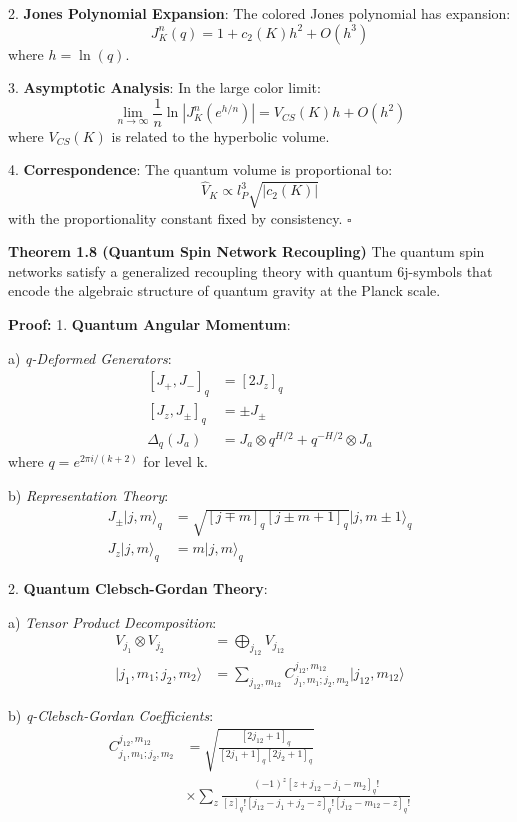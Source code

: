 \documentclass[12pt,a4paper]{article}
\begin{document}
2. \textbf{Jones Polynomial Expansion}:
   The colored Jones polynomial has expansion:
   \[
   J_K^n(q) = 1 + c_2(K)h^2 + O(h^3)
   \]
   where $h = \ln(q)$.

3. \textbf{Asymptotic Analysis}:
   In the large color limit:
   \[
   \lim_{n\to\infty} \frac{1}{n}\ln|J_K^n(e^{h/n})| = V_{CS}(K)h + O(h^2)
   \]
   where $V_{CS}(K)$ is related to the hyperbolic volume.

4. \textbf{Correspondence}:
   The quantum volume is proportional to:
   \[
   \hat{V}_K \propto l_P^3\sqrt{|c_2(K)|}
   \]
   with the proportionality constant fixed by consistency. $\square$

\textbf{Theorem 1.8 (Quantum Spin Network Recoupling)}
The quantum spin networks satisfy a generalized recoupling theory with quantum 6j-symbols that encode the algebraic structure of quantum gravity at the Planck scale.

\textbf{Proof:}
1. \textbf{Quantum Angular Momentum}:
   
   a) \textit{q-Deformed Generators}:
      \[
      \begin{aligned}
      [J_+, J_-]_q &= [2J_z]_q \\
      [J_z, J_{\pm}]_q &= \pm J_{\pm} \\
      \Delta_q(J_a) &= J_a \otimes q^{H/2} + q^{-H/2} \otimes J_a
      \end{aligned}
      \]
      where $q = e^{2\pi i/(k+2)}$ for level k.
   
   b) \textit{Representation Theory}:
      \[
      \begin{aligned}
      J_{\pm}|j,m\rangle_q &= \sqrt{[j \mp m]_q[j \pm m + 1]_q}|j,m \pm 1\rangle_q \\
      J_z|j,m\rangle_q &= m|j,m\rangle_q
      \end{aligned}
      \]

2. \textbf{Quantum Clebsch-Gordan Theory}:
   
   a) \textit{Tensor Product Decomposition}:
      \[
      \begin{aligned}
      V_{j_1} \otimes V_{j_2} &= \bigoplus_{j_{12}} V_{j_{12}} \\
      |j_1,m_1;j_2,m_2\rangle &= \sum_{j_{12},m_{12}} C^{j_{12},m_{12}}_{j_1,m_1;j_2,m_2}|j_{12},m_{12}\rangle
      \end{aligned}
      \]
   
   b) \textit{q-Clebsch-Gordan Coefficients}:
      \[
      \begin{aligned}
      C^{j_{12},m_{12}}_{j_1,m_1;j_2,m_2} &= \sqrt{\frac{[2j_{12}+1]_q}{[2j_1+1]_q[2j_2+1]_q}} \\
      &\times \sum_z \frac{(-1)^z[z+j_{12}-j_1-m_2]_q!}{[z]_q![j_{12}-j_1+j_2-z]_q![j_{12}-m_{12}-z]_q!}
      \end{aligned}
      \]
\end{document}
